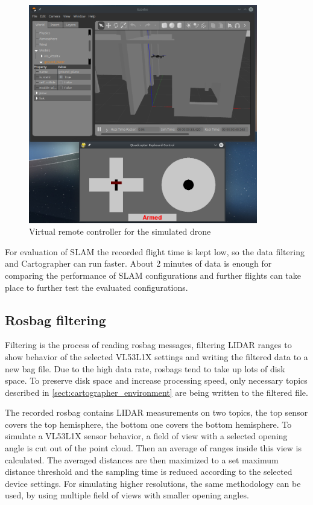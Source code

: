 \begin{figure}[!ht]
    \centering
    \includegraphics[width=100mm, keepaspectratio]{figures/fly_with_controller.png}
    \caption{Virtual remote controller for the simulated drone}
    \label{fig:remote_controller}
\end{figure}

For evaluation of SLAM the recorded flight time is kept low, so the data filtering and Cartographer 
can run faster. About 2 minutes of data is enough for comparing the performance of SLAM configurations
and further flights can take place to further test the evaluated configurations.

\subsection{Rosbag filtering}
Filtering is the process of reading rosbag messages, filtering LIDAR ranges to show behavior of the 
selected VL53L1X settings and writing the filtered data to a new bag file. Due to the high data rate, 
rosbags tend to take up lots of disk space. To preserve disk space and increase processing speed,
only necessary topics described in \ref{sect:cartographer_environment} are being written to the filtered file.

The recorded rosbag contains LIDAR measurements on two topics, the top sensor covers the top hemisphere,
the bottom one covers the bottom hemisphere. To simulate a VL53L1X sensor behavior, a field of view with a 
selected opening angle is cut out of the point cloud. Then an average of ranges inside this view is calculated.
The averaged distances are then maximized to a set maximum distance threshold and the sampling time is 
reduced according to the selected device settings. For simulating higher resolutions, the same methodology 
can be used, by using multiple field of views with smaller opening angles.

